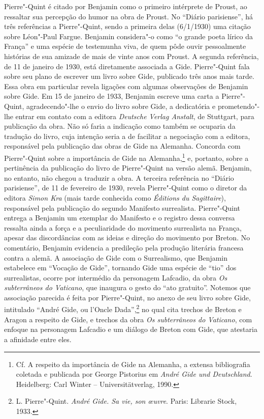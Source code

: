 Pierre"-Quint é citado por Benjamin como o primeiro intérprete de Proust,
ao ressaltar sua percepção do humor na obra de Proust. No ``Diário
parisiense'', há três referências a Pierre"-Quint, sendo a primeira delas
(6/1/1930) uma citação sobre Léon"-Paul Fargue. Benjamin considera"-o como
``o grande poeta lírico da França'' e uma espécie de testemunha viva, de
quem pôde ouvir pessoalmente histórias de sua amizade de mais de vinte
anos com Proust. A segunda referência, de 11 de janeiro de 1930, está
diretamente associada a Gide. Pierre"-Quint fala sobre seu plano de
escrever um livro sobre Gide, publicado três anos mais tarde. Essa obra
em particular revela ligações com algumas observações de Benjamin sobre
Gide. Em 15 de janeiro de 1933, Benjamin escreve uma carta a Pierre"-Quint,
agradecendo"-lhe o envio do livro sobre Gide, a dedicatória e
prometendo"-lhe entrar em contato com a editora \emph{Deutsche Verlag
Anstalt}, de Stuttgart, para publicação da obra. Não só faria a
indicação como também se ocuparia da tradução do livro, cuja intenção
seria a de facilitar a negociação com a editora, responsável pela
publicação das obras de Gide na Alemanha. Concorda com Pierre"-Quint
sobre a importância de Gide na Alemanha,\footnote{Cf. A respeito da
  importância de Gide na Alemanha, a extensa bibliografia coletada e
  publicada por George Pistorius em \emph{André Gide und Deutschland}.
  Heidelberg: Carl Winter -- Universitätverlag, 1990.} e, portanto, sobre
a pertinência da publicação do livro de Pierre"-Quint na versão alemã.
Benjamin, no entanto, não chegou a traduzir a obra. A terceira
referência no ``Diário parisiense'', de 11 de fevereiro de 1930, revela Pierre"-Quint
como o diretor da editora \emph{Simon Kra} (mais tarde conhecida como
\emph{Éditions du Sagittaire}), responsável pela publicação do segundo
Manifesto surrealista. Pierre"-Quint entrega a Benjamin um exemplar do
Manifesto e o registro dessa conversa ressalta ainda a força e a
peculiaridade do movimento surrealista na França, apesar das
discordâncias com as ideias e direção do movimento por Breton. No
comentário, Benjamin evidencia a predileção pela produção literária
francesa contra a alemã. A associação de Gide com o Surrealismo, que
Benjamin estabelece em ``Vocação de Gide'', tornando Gide uma espécie de
``tio'' dos surrealistas, ocorre por intermédio da personagem
Lafcadio, da obra \emph{Os subterrâneos do Vaticano}, que
inaugura o gesto do ``ato gratuito''. Notemos que associação parecida é
feita por Pierre"-Quint, no anexo de seu livro sobre Gide, intitulado
``André Gide, ou l'Oncle Dada'',\footnote{L. Pierre"-Quint. \emph{André
  Gide. Sa vie, son \oe uvre}. Paris: Librarie Stock, 1933.} no qual
cita trechos de Breton e Aragon a respeito de Gide, e trechos da obra
\emph{Os subterrâneos do Vaticano}, com enfoque na personagem
Lafcadio e um diálogo de Breton com Gide, que atestaria a afinidade
entre eles.

